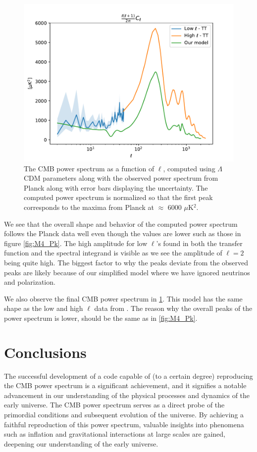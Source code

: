 \documentclass{aa}
\begin{document}
\begin{figure}[h!]
   \includegraphics[scale=0.5]{Figures/milestone_4/C_ell.pdf}
   \caption{The CMB power spectrum as a function of $\ell$, computed using $\Lambda$CDM parameters along with the observed power spectrum from Planck along with error bars displaying the uncertainty. The computed power spectrum is normalized so that the first peak corresponds to the maxima from Planck at $\approx$ 6000 $\mu$K$^2$.}
\label{fig:M4_Cell}
\end{figure}
We see that the overall shape and behavior of the computed power spectrum follows the Planck data well even though the values are lower such as those in figure \ref{fig:M4_Pk}. The high amplitude for low $\ell$'s found in both the transfer function and the spectral integrand is visible as we see the amplitude of $\ell = 2$ being quite high. The biggest factor to why the peaks deviate from the observed peaks are likely because of our simplified model where we have ignored neutrinos and polarization. 

We also observe the final CMB power spectrum in \ref{fig:M4_Cell}. This model has the same shape as the low and high $\ell$ data from \cite{2}. The reason why the overall peaks of the power spectrum is lower, should be the same as in \ref{fig:M4_Pk}.





\section{Conclusions}
The successful development of a code capable of (to a certain degree) reproducing the CMB power spectrum is a significant achievement, and it signifies a notable advancement in our understanding of the physical processes and dynamics of the early universe. The CMB power spectrum serves as a direct probe of the primordial conditions and subsequent evolution of the universe. By achieving a faithful reproduction of this power spectrum, valuable insights into phenomena such as inflation and gravitational interactions at large scales are gained, deepening our understanding of the early universe.
\end{document}
